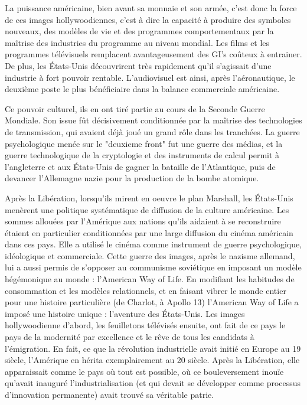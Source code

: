 \documentclass[a4paper,14pt]{extreport}
\begin{document}
La puissance américaine, bien avant sa monnaie et son armée, c'est donc la force de ces images hollywoodiennes, c'est à dire la capacité à produire des symboles nouveaux, des modèles de vie et des programmes comportementaux par la maîtrise des industries du programme au niveau mondial. Les films et les programmes télévisuels remplacent avantageusement des GI's coûteux à entrainer. De plus, les États-Unis découvrirent très rapidement qu’il s’agissait d’une industrie à fort pouvoir rentable. L'audiovisuel est ainsi, après l'aéronautique, le deuxième poste le plus bénéficiaire dans la balance commerciale américaine.

Ce pouvoir culturel, ils en ont tiré partie au cours de la Seconde Guerre Mondiale. Son issue fût décisivement conditionnée par la maîtrise des technologies de transmission, qui avaient déjà joué un grand rôle dans les tranchées. La guerre psychologique menée sur le "deuxieme front" fut une guerre des médias, et la guerre technologique de la cryptologie et des instruments de calcul permit à l'angleterre et aux États-Unis de gagner la bataille de l'Atlantique, puis de devancer l'Allemagne nazie pour la production de la bombe atomique.

Après la Libération, lorsqu'ils mirent en oeuvre le plan Marshall, les États-Unis menèrent une politique systématique de diffusion de la culture américaine. Les sommes allouées par l'Amérique aux nations qu'ils aidaient à se reconstruire étaient en particulier conditionnées par une large diffusion du cinéma américain dans ces pays. Elle a utilisé le cinéma comme instrument de guerre psychologique, idéologique et commerciale. Cette guerre des images, après le nazisme allemand, lui a aussi permis de s'opposer au communisme soviétique en imposant un modèle hégémonique au monde :  l'American Way of Life. En modifiant les habitudes de consommation et les modèles relationnels, et en faisant vibrer le monde entier pour une histoire particulière (de Charlot, à Apollo 13) l'American Way of Life a imposé une histoire unique : l'aventure des États-Unis. Les images hollywoodienne d'abord, les feuilletons télévisés ensuite, ont fait de ce pays le pays de la modernité par excellence et le rêve de tous les candidats à l'émigration. En fait, ce que la révolution industrielle avait initié en Europe au 19 siècle, l'Amérique en hérita exemplairement au 20 siècle.  Après la Libération, elle  apparaissait comme le pays où tout est possible, où ce bouleversement inouïe qu'avait inauguré l'industrialisation (et qui devait se développer comme processus d'innovation permanente) avait trouvé sa véritable patrie.
\end{document}
